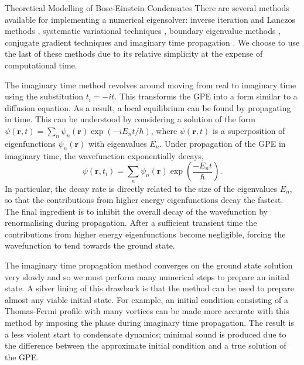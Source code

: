 \begin{chapter}{\label{cha:theoretical_model}Theoretical Modelling of Bose-Einstein Condensates}
There are several methods available for implementing a numerical eigensolver: inverse iteration and Lanczos methods \cite{thijssen1999computational}, systematic variational techniques \cite{Bao2003230}, boundary eigenvalue methods \cite{Edwards95}, conjugate gradient techniques \cite{NumericalRecipes} and imaginary time propagation \cite{PhysRevE.62.7438}. We choose to use the last of these methods due to its relative simplicity at the expense of computational time.

The imaginary time method revolves around moving from real to imaginary time using the substitution $t_i = -it$. This transforms the GPE into a form similar to a diffusion equation. As a result, a local equilibrium can be found by propagating in time. This can be understood by considering a solution of the form $\psi(\mathbf{r},t) = \sum_n \psi_n(\mathbf{r})\exp(-i E_n t/\hbar)$, where $\psi(\mathbf{r},t)$ is a superposition of eigenfunctions $\psi_n(\mathbf{r})$ with eigenvalues $E_n$. Under propagation of the GPE in imaginary time, the wavefunction exponentially decays,
\begin{equation*}
\psi(\mathbf{r},t_i) = \sum_n \psi_n(\mathbf{r})\exp\left(\frac{-E_n t}{\hbar}\right).
\end{equation*}
In particular, the decay rate is directly related to the size of the eigenvalues $E_n$, so that the contributions from higher energy eigenfunctions decay the fastest. The final ingredient is to inhibit the overall decay of the wavefunction by renormalising during propagation. After a sufficient transient time the contributions from higher energy eigenfunctions become negligible, forcing the wavefunction to tend towards the ground state.

The imaginary time propagation method converges on the ground state solution very slowly and so we must perform many numerical steps to prepare an initial state. A silver lining of this drawback is that the method can be used to prepare almost any viable initial state. For example, an initial condition consisting of a Thomas-Fermi profile with many vortices can be made more accurate with this method by imposing the phase during imaginary time propagation. The result is a less violent start to condensate dynamics; minimal sound is produced due to the difference between the approximate initial condition and a true solution of the GPE.


\end{chapter}
